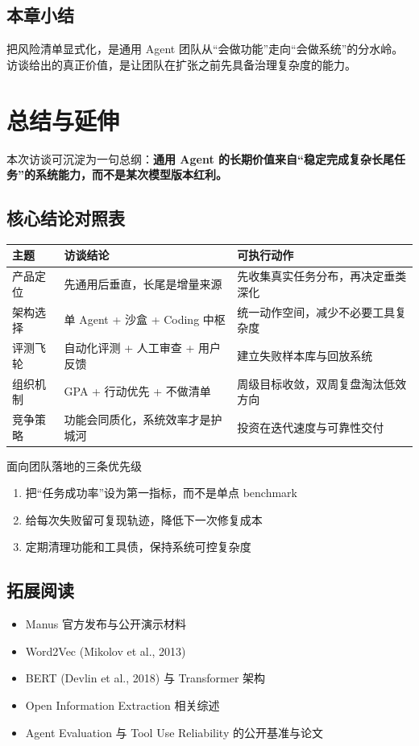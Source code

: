 \documentclass[a4paper]{article}
\begin{document}
\subsection{本章小结}

把风险清单显式化，是通用 Agent 团队从“会做功能”走向“会做系统”的分水岭。访谈给出的真正价值，是让团队在扩张之前先具备治理复杂度的能力。


\section{总结与延伸}

本次访谈可沉淀为一句总纲：\textbf{通用 Agent 的长期价值来自“稳定完成复杂长尾任务”的系统能力，而不是某次模型版本红利。}

\subsection{核心结论对照表}

\begin{center}
\begin{tabular}{p{3.4cm}p{5.1cm}p{5.3cm}}
\toprule
主题 & 访谈结论 & 可执行动作 \\
\midrule
产品定位 & 先通用后垂直，长尾是增量来源 & 先收集真实任务分布，再决定垂类深化 \\
架构选择 & 单 Agent + 沙盒 + Coding 中枢 & 统一动作空间，减少不必要工具复杂度 \\
评测飞轮 & 自动化评测 + 人工审查 + 用户反馈 & 建立失败样本库与回放系统 \\
组织机制 & GPA + 行动优先 + 不做清单 & 周级目标收敛，双周复盘淘汰低效方向 \\
竞争策略 & 功能会同质化，系统效率才是护城河 & 投资在迭代速度与可靠性交付 \\
\bottomrule
\end{tabular}
\end{center}

\begin{importantbox}{面向团队落地的三条优先级}
\begin{enumerate}
    \item 把“任务成功率”设为第一指标，而不是单点 benchmark
    \item 给每次失败留可复现轨迹，降低下一次修复成本
    \item 定期清理功能和工具债，保持系统可控复杂度
\end{enumerate}
\end{importantbox}

\subsection{拓展阅读}

\begin{itemize}
    \item Manus 官方发布与公开演示材料
    \item Word2Vec (Mikolov et al., 2013)
    \item BERT (Devlin et al., 2018) 与 Transformer 架构
    \item Open Information Extraction 相关综述
    \item Agent Evaluation 与 Tool Use Reliability 的公开基准与论文
\end{itemize}

\end{document}
